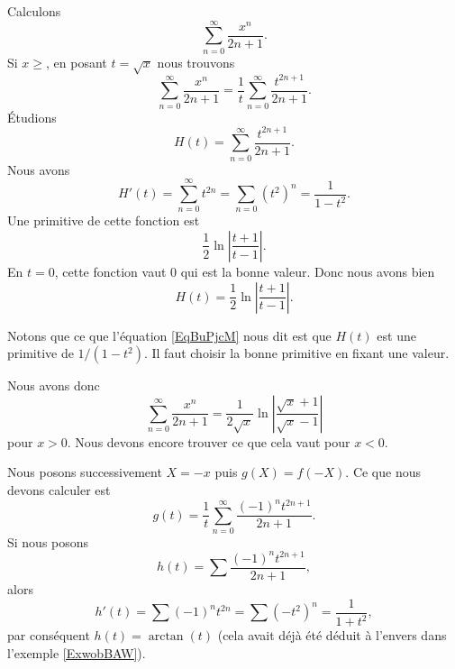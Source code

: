 \begin{example}
Calculons
\begin{equation}
    \sum_{n=0}^{\infty}\frac{ x^n }{ 2n+1 }.
\end{equation}
Si \( x\geq\), en posant \( t=\sqrt{x}\) nous trouvons
\begin{equation}
    \sum_{n=0}^{\infty}\frac{ x^n }{ 2n+1 }=\frac{1}{ t }\sum_{n=0}^{\infty}\frac{ t^{2n+1} }{ 2n+1 }.
\end{equation}
Étudions
\begin{equation}
    H(t)=\sum_{n=0}^{\infty}\frac{ t^{2n+1} }{ 2n+1 }.
\end{equation}
Nous avons 
\begin{equation}     \label{EqBuPjcM}
    H'(t)=\sum_{n=0}^{\infty}t^{2n}=\sum_{n=0}(t^2)^n=\frac{1}{ 1-t^2 }.
\end{equation}
Une primitive de cette fonction est
\begin{equation}
    \frac{ 1 }{2}\ln\left| \frac{ t+1 }{ t-1 } \right|.
\end{equation}
En \( t=0\), cette fonction vaut \( 0\) qui est la bonne valeur. Donc nous avons bien
\begin{equation}
    H(t)=\frac{ 1 }{2}\ln\left| \frac{ t+1 }{ t-1 } \right|.
\end{equation}

Notons que ce que l'équation \eqref{EqBuPjcM} nous dit est que \( H(t)\) est une primitive de \( 1/(1-t^2)\). Il faut choisir la bonne primitive en fixant une valeur.





Nous avons donc
\begin{equation}
    \sum_{n=0}^{\infty}\frac{ x^n }{ 2n+1 }=\frac{ 1 }{2\sqrt{x}}\ln\left| \frac{ \sqrt{x}+1 }{ \sqrt{x}-1 } \right| 
\end{equation}
pour \( x>0\). Nous devons encore trouver ce que cela vaut pour \( x<0\).

    Nous posons successivement \( X=-x\) puis \( g(X)=f(-X)\). Ce que nous devons calculer est
    \begin{equation}
        g(t)=\frac{1}{ t }\sum_{n=0}^{\infty}\frac{ (-1)^nt^{2n+1} }{ 2n+1 }.
    \end{equation}
    Si nous posons
    \begin{equation}
        h(t)=\sum \frac{ (-1)^nt^{2n+1} }{ 2n+1 },
    \end{equation}
    alors
    \begin{equation}
        h'(t)=\sum (-1)^nt^{2n}=\sum (-t^2)^n=\frac{1}{ 1+t^2 },
    \end{equation}
    par conséquent \( h(t)=\arctan(t)\) (cela avait déjà été déduit à l'envers dans l'exemple \ref{ExwobBAW}).


\end{example}
